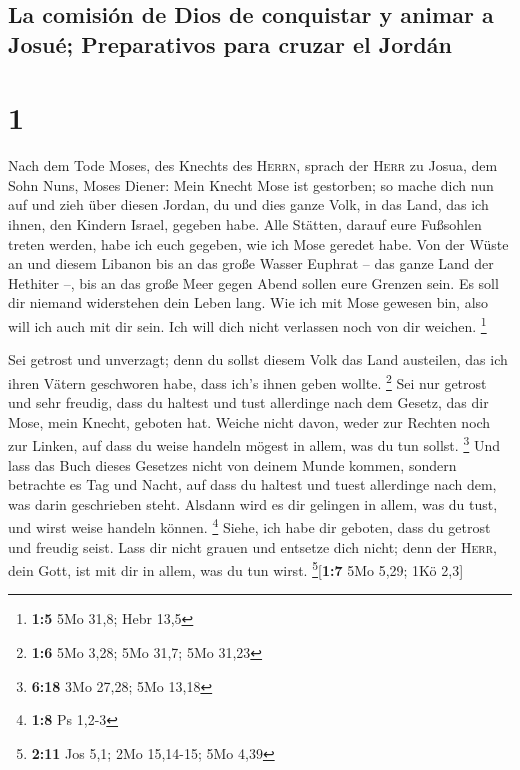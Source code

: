 \hypertarget{la-comisiuxf3n-de-dios-de-conquistar-y-animar-a-josuuxe9-preparativos-para-cruzar-el-jorduxe1n}{%
\subsection{La comisión de Dios de conquistar y animar a Josué;
Preparativos para cruzar el
Jordán}\label{la-comisiuxf3n-de-dios-de-conquistar-y-animar-a-josuuxe9-preparativos-para-cruzar-el-jorduxe1n}}

\hypertarget{section}{%
\section{1}\label{section}}

 Nach dem Tode Moses, des Knechts des \textsc{Herrn},
sprach der \textsc{Herr} zu Josua, dem Sohn Nuns, Moses Diener:
 Mein Knecht Mose ist gestorben; so mache dich nun auf und
zieh über diesen Jordan, du und dies ganze Volk, in das Land, das ich
ihnen, den Kindern Israel, gegeben habe.  Alle Stätten,
darauf eure Fußsohlen treten werden, habe ich euch gegeben, wie ich Mose
geredet habe.  Von der Wüste an und diesem Libanon bis an
das große Wasser Euphrat -- das ganze Land der Hethiter --, bis an das
große Meer gegen Abend sollen eure Grenzen sein.  Es soll
dir niemand widerstehen dein Leben lang. Wie ich mit Mose gewesen bin,
also will ich auch mit dir sein. Ich will dich nicht verlassen noch von
dir weichen. \footnote{\textbf{1:5} 5Mo 31,8; Hebr 13,5}

 Sei getrost und unverzagt; denn du sollst diesem Volk das
Land austeilen, das ich ihren Vätern geschworen habe, dass ich's ihnen
geben wollte. \footnote{\textbf{1:6} 5Mo 3,28; 5Mo 31,7; 5Mo 31,23}
 Sei nur getrost und sehr freudig, dass du haltest und
tust allerdinge nach dem Gesetz, das dir Mose, mein Knecht, geboten hat.
Weiche nicht davon, weder zur Rechten noch zur Linken, auf dass du weise
handeln mögest in allem, was du tun sollst. \footnote{\textbf{6:18} 3Mo
  27,28; 5Mo 13,18}  Und lass das Buch dieses Gesetzes
nicht von deinem Munde kommen, sondern betrachte es Tag und Nacht, auf
dass du haltest und tuest allerdinge nach dem, was darin geschrieben
steht. Alsdann wird es dir gelingen in allem, was du tust, und wirst
weise handeln können. \footnote{\textbf{1:8} Ps 1,2-3} 
Siehe, ich habe dir geboten, dass du getrost und freudig seist. Lass dir
nicht grauen und entsetze dich nicht; denn der \textsc{Herr}, dein Gott,
ist mit dir in allem, was du tun wirst. \footnote{\textbf{2:11} Jos 5,1;
  2Mo 15,14-15; 5Mo 4,39}{[}\textbf{1:7} 5Mo 5,29; 1Kö 2,3{]}

